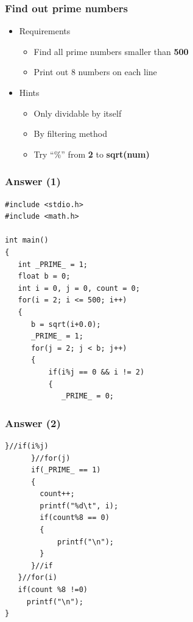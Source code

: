 \begin{frame}
\frametitle{Find out prime numbers}
\begin{itemize}
	\item {Requirements}
	\begin{itemize}
		\item {Find all prime numbers smaller than \textbf{500}}
		\item {Print out 8 numbers on each line}
	\end{itemize}
	\item{Hints}
	\begin{itemize}
		\item {Only dividable by itself}
		\item {By filtering method}
		\item {Try ``\%'' from \textbf{2} to \textbf{sqrt(num)}}
	\end{itemize}
\end{itemize}
\end{frame}

\ifx\answer\undefined
\begin{frame}[fragile]
\frametitle{Answer (1)}
\vspace{-0.15in}
\begin{lstlisting}[xleftmargin=0.05\linewidth, linewidth=0.9\linewidth]
#include <stdio.h>
#include <math.h>

int main()
{
   int _PRIME_ = 1;
   float b = 0;
   int i = 0, j = 0, count = 0;
   for(i = 2; i <= 500; i++)
   {
      b = sqrt(i+0.0);
      _PRIME_ = 1;
      for(j = 2; j < b; j++)
      {
          if(i%j == 0 && i != 2)
          {
             _PRIME_ = 0;
\end{lstlisting}

\end{frame}
\fi

\ifx\answer\undefined
\begin{frame}[fragile]
\frametitle{Answer (2)}
\vspace{-0.15in}
\begin{lstlisting}[firstnumber=18, xleftmargin=0.05\linewidth, linewidth=0.9\linewidth]
          }//if(i%j)
      }//for(j)
      if(_PRIME_ == 1)
      {
        count++;
        printf("%d\t", i);
        if(count%8 == 0)
        {
            printf("\n");
        }
      }//if
   }//for(i)
   if(count %8 !=0)
     printf("\n");
}
\end{lstlisting}

\end{frame}
\fi

